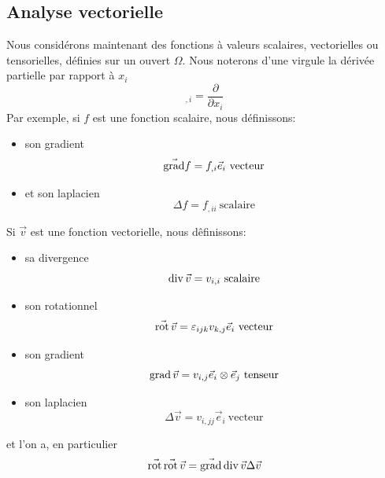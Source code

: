 \subsection{Analyse vectorielle} \label{ssec:AnnA:3.2}
Nous considérons maintenant des fonctions à valeurs scalaires, vectorielles ou tensorielles, définies sur un ouvert $\Omega$.
Nous noterons d'une virgule la dérivée partielle par rapport à $x_i$
\begin{equation}
    {}_{,i} = \frac{\partial}{\partial x_i}
    \label{eq:AnnA-054}
\end{equation}
Par exemple, si $f$ est une fonction scalaire, nous définissons:
\begin{itemize}
    \item son gradient
        \begin{equation}
            \vec{\operatorname*{\mathrm{grad}}} f = f_{,i} \vec{e}_i \ \text{vecteur}
            \label{eq:AnnA-055}
        \end{equation}
    \item et son laplacien
        \begin{equation}
            \Delta f = f_{,ii} \ \text{scalaire}
            \label{eq:AnnA-056}
        \end{equation}
\end{itemize}

Si $\vec{v}$ est une fonction vectorielle, nous dêfinissons:
\begin{itemize}
    \item sa divergence
        \begin{equation}
            \operatorname*{\mathrm{div}} \vec{v} = v_{i,i} \ \text{scalaire}
            \label{eq:AnnA-057}
        \end{equation}
    \item son rotationnel
        \begin{equation}
            \vec{\operatorname*{\mathrm{rot}\,}} \vec{v} = \varepsilon_{ijk} v_{k,j} \vec{e}_i \ \text{vecteur}
            \label{eq:AnnA-058}
        \end{equation}
    \item son gradient
        \begin{equation}
            \operatorname*{\mathrm{grad}} \vec{v} = v_{i,j} \vec{e}_i \otimes \vec{e}_j \ \text{tenseur}
            \label{eq:AnnA-059}
        \end{equation}
    \item son laplacien
        \begin{equation}
            \Delta \vec{v} = v_{i,jj} \vec{e}_i \ \text{vecteur}
            \label{eq:AnnA-060}
        \end{equation}
\end{itemize}
et l'on a, en particulier 
\begin{equation}
    \vec{\operatorname*{\mathrm{rot}\,}} \vec{\operatorname*{\mathrm{rot}\,}} \vec{v} = \vec{\operatorname*{\mathrm{grad}}} \operatorname*{\mathrm{div}} \vec{v} \Delta \vec{v}
    \label{eq:AnnA-061}
\end{equation}

